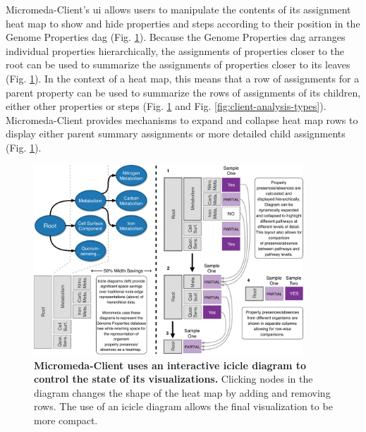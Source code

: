 Micromeda-Client's \gls{ui} allows users to manipulate the contents of its assignment heat map to show and hide properties and steps according to their position in the Genome Properties \gls{dag} \cite{richardson2018genome} (Fig. \ref{fig:visualization-philosophy}). Because the Genome Properties \gls{dag} arranges individual properties hierarchically, the assignments of properties closer to the root can be used to summarize the assignments of properties closer to its leaves (Fig. \ref{fig:visualization-philosophy}). In the context of a heat map, this means that a row of assignments for a parent property can be used to summarize the rows of assignments of its children, either other properties or steps (Fig. \ref{fig:visualization-philosophy} and Fig. \ref{fig:client-analysis-types}). Micromeda-Client provides mechanisms to expand and collapse heat map rows to display either parent summary assignments or more detailed child assignments (Fig. \ref{fig:visualization-philosophy}).

\begin{figure}[!ht]
  \centering
	\includegraphics[width=0.9\textwidth]{media/visualization_design_philosphy.pdf}
	 \caption[Micromeda-Client uses an interactive icicle diagram to control the state of its visualizations.]{\textbf{Micromeda-Client uses an interactive icicle diagram to control the state of its visualizations.} Clicking nodes in the diagram changes the shape of the heat map by adding and removing rows. The use of an icicle diagram allows the final visualization to be more compact.}
	 \label{fig:visualization-philosophy}
\end{figure}

